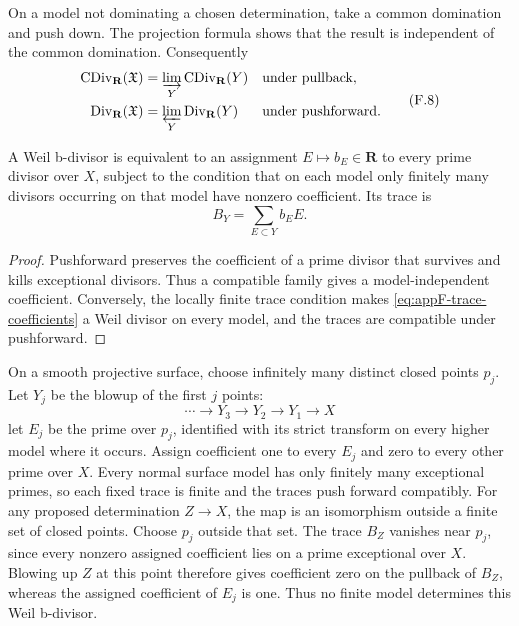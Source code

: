 On a model not dominating a chosen determination, take a common domination
and push down.
The projection formula shows that the result is independent of the common
domination.
Consequently
\[
\begin{aligned}
 \operatorname{CDiv}_{\mathbf R}(\mathfrak X)
   &=\varinjlim_Y\operatorname{CDiv}_{\mathbf R}(Y)
     &&\text{under pullback},\\
 \operatorname{Div}_{\mathbf R}(\mathfrak X)
   &=\varprojlim_Y\operatorname{Div}_{\mathbf R}(Y)
     &&\text{under pushforward}.
\end{aligned}
\tag{F.8}\label{eq:appF-direct-inverse}
\]

\begin{proposition}\label{prop:appF-coefficients}
A Weil b-divisor is equivalent to an assignment \(E\mapsto b_E\in\mathbf R\)
to every prime divisor over \(X\), subject to the condition that on each
model only finitely many divisors occurring on that model have nonzero
coefficient.
Its trace is
\[
                              B_Y=\sum_{E\subset Y}b_EE.
\tag{F.9}\label{eq:appF-trace-coefficients}
\]
\end{proposition}

\begin{proof}
Pushforward preserves the coefficient of a prime divisor that survives and
kills exceptional divisors.
Thus a compatible family gives a model-independent coefficient.
Conversely, the locally finite trace condition makes
\eqref{eq:appF-trace-coefficients} a Weil divisor on every model, and the
traces are compatible under pushforward.
\end{proof}

\begin{example}
\label{ex:appF-non-cartier-bdivisor}
On a smooth projective surface, choose infinitely many distinct closed
points \(p_j\).  Let \(Y_j\) be the blowup of the first \(j\) points:
\[
 \cdots\longrightarrow Y_3\longrightarrow Y_2\longrightarrow Y_1
 \longrightarrow X
\]
let \(E_j\) be the prime over \(p_j\), identified with its strict
transform on every higher model where it occurs.
Assign coefficient one to every \(E_j\) and zero to every other prime over
\(X\).
Every normal surface model has only finitely many exceptional primes,
so each fixed trace is finite and the traces push forward compatibly.
For any proposed determination \(Z\to X\), the map is an isomorphism
outside a finite set of closed points.  Choose \(p_j\) outside that set.
The trace \(B_Z\) vanishes near \(p_j\), since every nonzero assigned
coefficient lies on a prime exceptional over \(X\).  Blowing up \(Z\)
at this point therefore gives coefficient zero on the pullback of
\(B_Z\), whereas the assigned coefficient of \(E_j\) is one.
Thus no finite model determines this Weil b-divisor.
\end{example}

